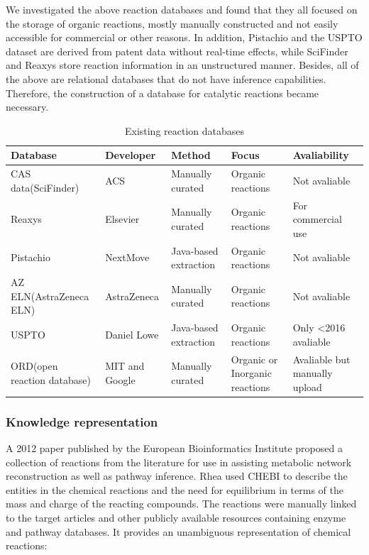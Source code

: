 \documentclass[%
 aip,
 jmp,%
 amsmath,amssymb,
 reprint,%
]{revtex4-2}
\begin{document}
We investigated the above reaction databases and found that they all focused on the storage of organic reactions, mostly manually constructed and not easily accessible for commercial or other reasons. In addition, Pistachio and the USPTO dataset are derived from patent data without real-time effects, while SciFinder and Reaxys store reaction information in an unstructured manner. Besides, all of the above are relational databases that do not have inference capabilities. Therefore, the construction of a database for catalytic reactions became necessary.

\begin{table}[h!]
\begin{tabular}{ |p{3cm}|p{3cm}|p{3cm}|p{3cm}|p{3cm}|  }
\hline
Database&Developer&Method&Focus&Avaliability\\ \hline
CAS data(SciFinder)& ACS    &Manually curated&   Organic reactions&Not avaliable\\ \hline
Reaxys&   Elsevier  & Manually curated   &Organic reactions&For commercial use\\ \hline
Pistachio & NextMove & Java-based extraction &  Organic reactions&Not avaliable\\ \hline
AZ ELN(AstraZeneca ELN)    &AstraZeneca & Manually curated&  Organic reactions&Not avaliable\\ \hline
USPTO&   Daniel Lowe  & Java-based extraction&Organic reactions&Only <2016 avaliable\\ \hline
ORD(open reaction database) & MIT and Google  & Manually curated   &Organic or Inorganic reactions&Avaliable but manually upload\\ \hline
\end{tabular}
\caption{Existing reaction databases}
\label{ table.1 }
\end{table}

\subsubsection{Knowledge representation}

A 2012 paper published by the European Bioinformatics Institute proposed a collection of reactions from the literature for use in assisting metabolic network reconstruction as well as pathway inference\cite{alcantara2012rhea}. Rhea used CHEBI to describe the entities in the chemical reactions and the need for equilibrium in terms of the mass and charge of the reacting compounds. The reactions were manually linked to the target articles and other publicly available resources containing enzyme and pathway databases. It provides an unambiguous representation of chemical reactions:
\end{document}
